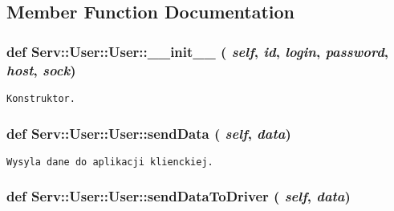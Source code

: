 \subsection{Member Function Documentation}
\hypertarget{class_serv_1_1_user_1_1_user_e503b7d48b7eb7c8a399f2652a3ff002}{
\subsubsection[{\_\-\_\-init\_\-\_\-}]{\setlength{\rightskip}{0pt plus 5cm}def Serv::User::User::\_\-\_\-init\_\-\_\- ( {\em self}, \/   {\em id}, \/   {\em login}, \/   {\em password}, \/   {\em host}, \/   {\em sock})}}
\label{class_serv_1_1_user_1_1_user_e503b7d48b7eb7c8a399f2652a3ff002}




\footnotesize\begin{verbatim}Konstruktor.\end{verbatim}
\normalsize
 \hypertarget{class_serv_1_1_user_1_1_user_2d0441db55283b641079acb8bf67c30a}{
\subsubsection[{sendData}]{\setlength{\rightskip}{0pt plus 5cm}def Serv::User::User::sendData ( {\em self}, \/   {\em data})}}
\label{class_serv_1_1_user_1_1_user_2d0441db55283b641079acb8bf67c30a}




\footnotesize\begin{verbatim}Wysyla dane do aplikacji klienckiej.\end{verbatim}
\normalsize
 \hypertarget{class_serv_1_1_user_1_1_user_0907f262b618e5b6c05c6e3584e24b44}{
\subsubsection[{sendDataToDriver}]{\setlength{\rightskip}{0pt plus 5cm}def Serv::User::User::sendDataToDriver ( {\em self}, \/   {\em data})}}
\label{class_serv_1_1_user_1_1_user_0907f262b618e5b6c05c6e3584e24b44}




